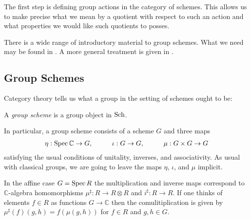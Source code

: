 \documentclass[12pt]{ociamthesis}  %
\begin{document}
The first step is defining group actions in the category of schemes.
This allows us to make precise what we mean by a quotient with
respect to such an action and what properties we would like such
quotients to posses.

There is a wide range of introductory material to group schemes.
What we need may be found in \cite{hoskins2016}. A more general
treatment is given in \cite{milne2017}.

\subsection{Group Schemes}

Category theory tells us what a group in the
setting of schemes ought to be:

\begin{definition}
  A \emph{group scheme} is a group object in $\operatorname{Sch}$.
\end{definition}
In particular, a group scheme consists of a scheme $G$ and three maps
\begin{align}\label{eq:group_maps}
  \eta:\operatorname{Spec}\mathbb{C}\to G,\hspace{1cm}
  \iota:G\to G,\hspace{1cm}
  \mu:G\times G\to G
\end{align}
satisfying the usual conditions of unitality, inverses, and associativity.
As usual with classical groups, we are going to leave the maps
$\eta$, $\iota$, and $\mu$ implicit.

In the affine case $G = \operatorname{Spec} R$ the multiplication and inverse maps
correspond to $\mathbb{C}$-algebra homomorphisms
$\mu^\sharp : R \to R\otimes R$ and $i^\sharp : R\to R$.
If one thinks of elements $f\in R$ as functions $G\to\mathbb C$
then the comulitiplication is given by $\mu^\sharp(f)(g,h) = f(\mu(g,h))$
for $f\in R$ and $g,h\in G$.
\end{document}
